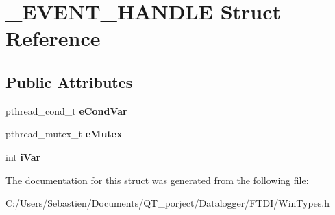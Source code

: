\hypertarget{struct___e_v_e_n_t___h_a_n_d_l_e}{}\section{\+\_\+\+E\+V\+E\+N\+T\+\_\+\+H\+A\+N\+D\+LE Struct Reference}
\label{struct___e_v_e_n_t___h_a_n_d_l_e}
\subsection*{Public Attributes}
\begin{DoxyCompactItemize}
\item 
\mbox{\label{struct___e_v_e_n_t___h_a_n_d_l_e_a22f9905a075b5f0c84fa336b8532e756}} 
pthread\+\_\+cond\+\_\+t {\bfseries e\+Cond\+Var}
\item 
\mbox{\label{struct___e_v_e_n_t___h_a_n_d_l_e_ac18c63dbb1acc29ff1104b80fe7b4269}} 
pthread\+\_\+mutex\+\_\+t {\bfseries e\+Mutex}
\item 
\mbox{\label{struct___e_v_e_n_t___h_a_n_d_l_e_aa96bc22ec0f4f46df8e3ad9f1bbb7baa}} 
int {\bfseries i\+Var}
\end{DoxyCompactItemize}


The documentation for this struct was generated from the following file\+:\begin{DoxyCompactItemize}
\item 
C\+:/\+Users/\+Sebastien/\+Documents/\+Q\+T\+\_\+porject/\+Datalogger/\+F\+T\+D\+I/Win\+Types.\+h\end{DoxyCompactItemize}
